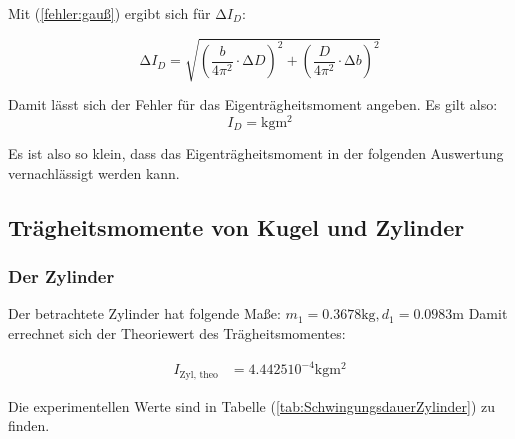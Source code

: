 Mit (\ref{fehler:gauß}) ergibt sich  für $\increment I_{D}$:

\begin{equation*}
  \increment I_{D} = \sqrt{\left(\frac{b}{4 \pi^2} \cdot  \increment D\right)^2 + \left(\frac{D}{4 \pi^2} \cdot  \increment b\right)^2}
\end{equation*}


Damit lässt sich der Fehler für das Eigenträgheitsmoment angeben. Es gilt also:
\begin{equation*}
  I_{D} =  \unit{\kilo\gram\meter\squared}
\end{equation*}

Es ist also so klein, dass das Eigenträgheitsmoment in der folgenden Auswertung vernachlässigt werden kann.

\subsection{Trägheitsmomente von Kugel und Zylinder}
\label{sec:KugelundZylinder}

\subsubsection*{Der Zylinder}
Der betrachtete Zylinder hat folgende Maße: $m_1 = 0.3678 \unit{\kilo\gram}, d_1 = 0.0983 \unit{\meter}$
Damit errechnet sich der Theoriewert des Trägheitsmomentes:

\begin{align*}
  I_{\text{Zyl, theo}} &= 4.4425 10^{-4} \unit{\kilo\gram\meter\squared}
\end{align*}

Die experimentellen Werte sind in Tabelle (\ref{tab:SchwingungsdauerZylinder}) zu finden.

